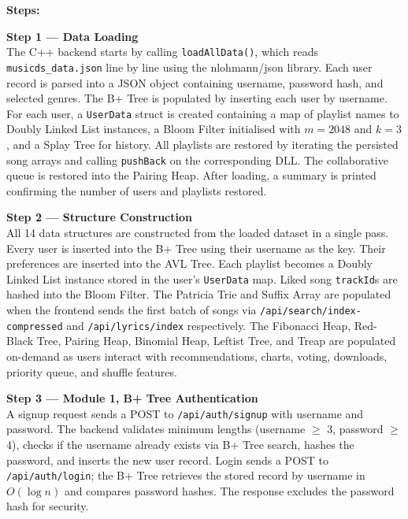 \documentclass[12pt, a4paper]{article}
\begin{document}

\textbf{Steps:}

\textbf{Step 1 --- Data Loading}\\
The C++ backend starts by calling \texttt{loadAllData()}, which reads \texttt{musicds\_data.json} line by line using the nlohmann/json library. Each user record is parsed into a JSON object containing username, password hash, and selected genres. The B+ Tree is populated by inserting each user by username. For each user, a \texttt{UserData} struct is created containing a map of playlist names to Doubly Linked List instances, a Bloom Filter initialised with $m = 2048$ and $k = 3$, and a Splay Tree for history. All playlists are restored by iterating the persisted song arrays and calling \texttt{pushBack} on the corresponding DLL. The collaborative queue is restored into the Pairing Heap. After loading, a summary is printed confirming the number of users and playlists restored.

\textbf{Step 2 --- Structure Construction}\\
All 14 data structures are constructed from the loaded dataset in a single pass. Every user is inserted into the B+ Tree using their username as the key. Their preferences are inserted into the AVL Tree. Each playlist becomes a Doubly Linked List instance stored in the user's \texttt{UserData} map. Liked song \texttt{trackId}s are hashed into the Bloom Filter. The Patricia Trie and Suffix Array are populated when the frontend sends the first batch of songs via \texttt{/api/search/index-compressed} and \texttt{/api/lyrics/index} respectively. The Fibonacci Heap, Red-Black Tree, Pairing Heap, Binomial Heap, Leftist Tree, and Treap are populated on-demand as users interact with recommendations, charts, voting, downloads, priority queue, and shuffle features.

\textbf{Step 3 --- Module 1, B+ Tree Authentication}\\
A signup request sends a POST to \texttt{/api/auth/signup} with username and password. The backend validates minimum lengths (username $\geq$ 3, password $\geq$ 4), checks if the username already exists via B+ Tree search, hashes the password, and inserts the new user record. Login sends a POST to \texttt{/api/auth/login}; the B+ Tree retrieves the stored record by username in $O(\log n)$ and compares password hashes. The response excludes the password hash for security.
\end{document}
